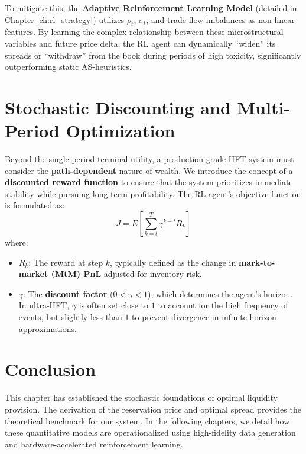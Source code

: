 To mitigate this, the \textbf{Adaptive Reinforcement Learning Model} (detailed in Chapter \ref{ch:rl_strategy}) utilizes $\rho_t$, $\sigma_t$, and trade flow imbalances as non-linear features. By learning the complex relationship between these microstructural variables and future price delta, the RL agent can dynamically ``widen'' its spreads or ``withdraw'' from the book during periods of high toxicity, significantly outperforming static AS-heuristics.

\section{Stochastic Discounting and Multi-Period Optimization}
Beyond the single-period terminal utility, a production-grade HFT system must consider the \textbf{path-dependent} nature of wealth. We introduce the concept of a \textbf{discounted reward function} to ensure that the system prioritizes immediate stability while pursuing long-term profitability. The RL agent's objective function is formulated as:
\begin{equation}
    J = E \left[ \sum_{k=t}^{T} \gamma^{k-t} R_k \right]
\end{equation}
where:
\begin{itemize}
    \item $R_k$: The reward at step $k$, typically defined as the change in \textbf{mark-to-market (MtM) PnL} adjusted for inventory risk.
    \item $\gamma$: The \textbf{discount factor} ($0 < \gamma < 1$), which determines the agent's horizon. In ultra-HFT, $\gamma$ is often set close to $1$ to account for the high frequency of events, but slightly less than $1$ to prevent divergence in infinite-horizon approximations.
\end{itemize}
\section{Conclusion}
This chapter has established the stochastic foundations of optimal liquidity provision. The derivation of the reservation price and optimal spread provides the theoretical benchmark for our system. In the following chapters, we detail how these quantitative models are operationalized using high-fidelity data generation and hardware-accelerated reinforcement learning.
